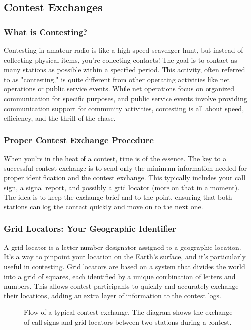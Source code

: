 \subsection{Contest Exchanges}
\label{subsec:contest-exchanges}

\subsubsection*{What is Contesting?}
Contesting in amateur radio is like a high-speed scavenger hunt, but instead of collecting physical items, you're collecting contacts! The goal is to contact as many stations as possible within a specified period. This activity, often referred to as "contesting," is quite different from other operating activities like net operations or public service events. While net operations focus on organized communication for specific purposes, and public service events involve providing communication support for community activities, contesting is all about speed, efficiency, and the thrill of the chase.

\subsubsection*{Proper Contest Exchange Procedure}
When you're in the heat of a contest, time is of the essence. The key to a successful contest exchange is to send only the minimum information needed for proper identification and the contest exchange. This typically includes your call sign, a signal report, and possibly a grid locator (more on that in a moment). The idea is to keep the exchange brief and to the point, ensuring that both stations can log the contact quickly and move on to the next one.

\subsubsection*{Grid Locators: Your Geographic Identifier}
A grid locator is a letter-number designator assigned to a geographic location. It's a way to pinpoint your location on the Earth's surface, and it's particularly useful in contesting. Grid locators are based on a system that divides the world into a grid of squares, each identified by a unique combination of letters and numbers. This allows contest participants to quickly and accurately exchange their locations, adding an extra layer of information to the contest logs.

\begin{figure}[h]
    \centering
    \caption{Flow of a typical contest exchange. The diagram shows the exchange of call signs and grid locators between two stations during a contest.}
    \label{fig:contest-exchange-flow}
\end{figure}

